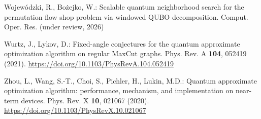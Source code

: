 \documentclass[11pt,a4paper]{article}
\newif\ifblind\blindfalse
\begin{document}
\begin{thebibliography}{22}
\ifblind
[Authors omitted for blind review]: Scalable quantum neighborhood search
for the permutation flow shop problem via windowed QUBO decomposition.
Comput. Oper. Res. (under review, 2026)
\else
Wojew\'{o}dzki, R., Bo\.{z}ejko, W.: Scalable quantum neighborhood search
for the permutation flow shop problem via windowed QUBO decomposition.
Comput. Oper. Res. (under review, 2026)
\fi

Wurtz, J., Lykov, D.: Fixed-angle conjectures for the quantum approximate
optimization algorithm on regular MaxCut graphs. Phys. Rev. A
\textbf{104}, 052419 (2021).
\url{https://doi.org/10.1103/PhysRevA.104.052419}

Zhou, L., Wang, S.-T., Choi, S., Pichler, H., Lukin, M.D.: Quantum
approximate optimization algorithm: performance, mechanism, and
implementation on near-term devices. Phys. Rev. X \textbf{10}, 021067
(2020). \url{https://doi.org/10.1103/PhysRevX.10.021067}

\end{thebibliography}
\end{document}
